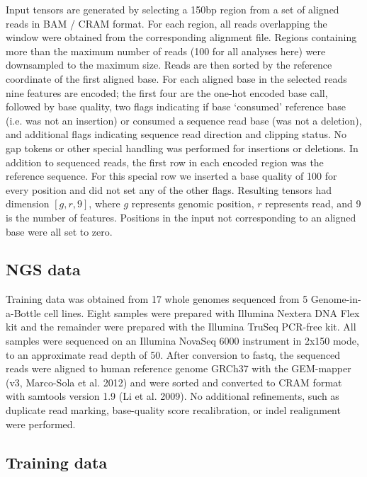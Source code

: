\documentclass[]{article}
\begin{document}
Input tensors are generated by selecting a 150bp region from a set of aligned reads in BAM / CRAM format. For each region, all reads overlapping the window were obtained from the corresponding alignment file. Regions containing more than the maximum number of reads (100 for all analyses here) were downsampled to the maximum size.  Reads are then sorted by the reference coordinate of the first aligned base. For each aligned base in the selected reads nine features are encoded; the first four are the one-hot encoded base call, followed by base quality, two flags indicating if base `consumed' reference base (i.e. was not an insertion) or consumed a sequence read base (was not a deletion), and additional flags indicating sequence read direction and clipping status.  No gap tokens or other special handling was performed for insertions or deletions. In addition to sequenced reads, the first row in each encoded region was the reference sequence. For this special row we inserted a base quality of 100 for every position and did not set any of the other flags. Resulting tensors had dimension $[g, r, 9]$, where $g$ represents genomic position, $r$ represents read, and 9 is the number of features. Positions in the input not corresponding to an aligned base were all set to zero. 


\subsection{NGS data}

Training data was obtained from 17 whole genomes sequenced from 5 Genome-in-a-Bottle cell lines. Eight samples were prepared with Illumina Nextera DNA Flex kit and the remainder were prepared with the Illumina TruSeq PCR-free kit. All samples were sequenced on an Illumina NovaSeq 6000 instrument in 2x150 mode, to an approximate read depth of 50. After conversion to fastq, the sequenced reads were aligned to human reference genome GRCh37 with the GEM-mapper (v3, Marco-Sola et al. 2012) and were sorted and converted to CRAM format with samtools version 1.9 (Li et al. 2009). No additional refinements, such as duplicate read marking, base-quality score recalibration, or indel realignment were performed.

\subsection{Training data}
\end{document}
